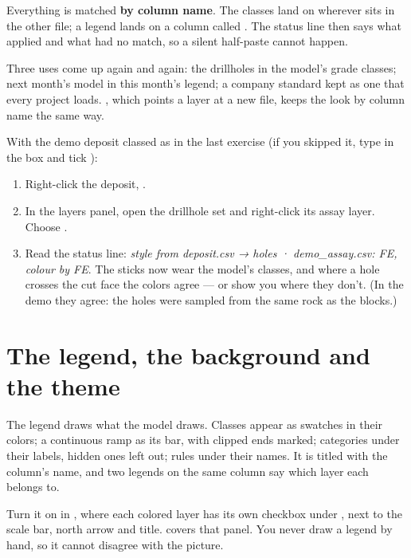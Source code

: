 Everything is matched \textbf{by column name}. The  classes land on  wherever  sits in the other file; a  legend lands on a column called . The status line then says what applied and what had no match, so a silent half-paste cannot happen.

Three uses come up again and again: the drillholes in the model's grade classes; next month's model in this month's legend; a company standard kept as one  that every project loads. , which points a layer at a new file, keeps the look by column name the same way.

\begin{tryit}
With the demo deposit classed as in the last exercise (if you skipped it, type  in the  box and tick ):
\begin{enumerate}
\item Right-click the deposit, .
\item In the layers panel, open the drillhole set and right-click its assay layer. Choose .
\item Read the status line: \emph{style from deposit.csv → holes · demo\_assay.csv: FE, colour by FE}. The sticks now wear the model's classes, and where a hole crosses the cut face the colors agree — or show you where they don't. (In the demo they agree: the holes were sampled from the same rock as the blocks.)
\end{enumerate}
\end{tryit}

\section{The legend, the background and the theme}\label{sec:color-legend}
The legend draws what the model draws. Classes appear as swatches in their colors; a continuous ramp as its bar, with clipped ends marked; categories under their labels, hidden ones left out; rules under their names. It is titled with the column's name, and two legends on the same column say which layer each belongs to.

Turn it on in , where each colored layer has its own checkbox under , next to the scale bar, north arrow and title.  covers that panel. You never draw a legend by hand, so it cannot disagree with the picture.

